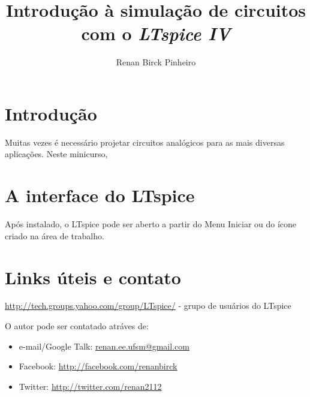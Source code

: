 \documentclass[]{report}
\title{\textbf{Introdução à simulação de circuitos com o \textit{LTspice IV}}}
\author{Renan Birck Pinheiro}
\begin{document}


\chapter{Introdução}
Muitas vezes é necessário projetar circuitos analógicos para as mais diversas aplicações.
Neste minicurso, 
\chapter{A interface do LTspice}
Após instalado, o LTspice pode ser aberto a partir do Menu Iniciar ou do ícone criado na área de trabalho.

\chapter{Links úteis e contato}
\item \url{http://tech.groups.yahoo.com/group/LTspice/} - grupo de usuários do LTspice

O autor pode ser contatado atráves de:

\begin{itemize}
\item e-mail/Google Talk: \url{renan.ee.ufsm@gmail.com}
\item Facebook: \url{http://facebook.com/renanbirck}
\item Twitter: \url{http://twitter.com/renan2112}
\end{itemize}
\end{document}
